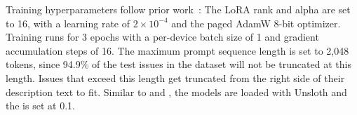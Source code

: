 Training hyperparameters follow prior work~\cite{heo2025study,aracena2025applying}: The LoRA rank and alpha are set to 16, with a learning rate of $2 \times 10^{-4}$ and the paged AdamW 8-bit optimizer. Training runs for 3 epochs with a per-device batch size of 1 and gradient accumulation steps of 16. The maximum prompt sequence length is set to 2,048 tokens, since 94.9\% of the test issues in the dataset will not be truncated at this length. Issues that exceed this length get truncated from the right side of their description text to fit.
Similar to \ragtag and \bragtag, the models are loaded with Unsloth and the  is set at 0.1.
